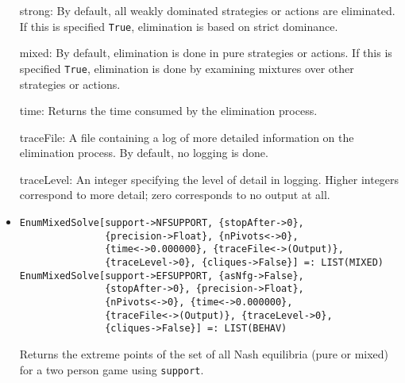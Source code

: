 \begin{itemize}
\bd
\item [strong:] By default, all weakly dominated strategies or actions
are eliminated.  If this is specified \verb+True+, elimination is based
on strict dominance.
\item [mixed:] By default, elimination is done in pure strategies or
actions.  If this is specified \verb+True+, elimination is done by
examining mixtures over other strategies or actions.
\item [time:] Returns the time consumed by the elimination process.
\item [traceFile:] A file containing a log of more detailed information
on the elimination process.  By default, no logging is done.
\item [traceLevel:] An integer specifying the level of detail in logging.
Higher integers correspond to more detail; zero corresponds to no output
at all.
\ed
\ed

\item{}
\protect \large \begin{verbatim}
EnumMixedSolve[support->NFSUPPORT, {stopAfter->0}, 
               {precision->Float}, {nPivots<->0}, 
               {time<->0.000000}, {traceFile<->(Output)}, 
               {traceLevel->0}, {cliques->False}] =: LIST(MIXED) 
EnumMixedSolve[support->EFSUPPORT, {asNfg->False}, 
               {stopAfter->0}, {precision->Float}, 
               {nPivots<->0}, {time<->0.000000}, 
               {traceFile<->(Output)}, {traceLevel->0},
               {cliques->False}] =: LIST(BEHAV) 
\end{verbatim}\normalsize
\bd
Returns the extreme points of the set of all Nash equilibria (pure or
mixed) for a two person game using \verb+support+.


\end{itemize}
